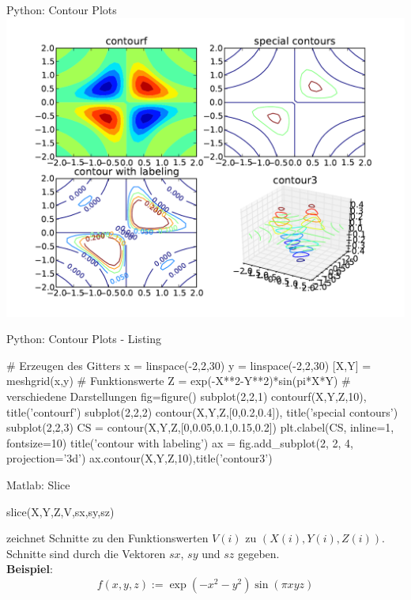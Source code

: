 \documentclass[hyperref={xetex}]{beamer}
\begin{document}
\begin{frame}[fragile]{Python: Contour Plots}
\hfil\includegraphics[width=1\textwidth]{figures/function_plot_contour_py}\hfil
\end{frame}
% 
% 
\begin{frame}[fragile]{Python: Contour Plots - Listing}
  \begin{pyin}
# Erzeugen des Gitters
x = linspace(-2,2,30)
y = linspace(-2,2,30)
[X,Y] = meshgrid(x,y)
# Funktionswerte
Z = exp(-X**2-Y**2)*sin(pi*X*Y)
# verschiedene Darstellungen
fig=figure()
subplot(2,2,1)
contourf(X,Y,Z,10), title('contourf')
subplot(2,2,2)
contour(X,Y,Z,[0,0.2,0.4]), title('special contours')
subplot(2,2,3)
CS = contour(X,Y,Z,[0,0.05,0.1,0.15,0.2])
plt.clabel(CS, inline=1, fontsize=10)
title('contour with labeling')
ax = fig.add_subplot(2, 2, 4, projection='3d')
ax.contour(X,Y,Z,10),title('contour3')    
  \end{pyin}
\end{frame}

%
% 
\begin{frame}[fragile]{Matlab: Slice}
\begin{matlabin}
slice(X,Y,Z,V,sx,sy,sz)
\end{matlabin}
zeichnet  Schnitte zu den Funktionswerten $V(i)$ zu
$(X(i),Y(i),Z(i))$. Schnitte sind durch die Vektoren $sx$, $sy$ und $sz$
gegeben.\\
\textbf{Beispiel}: \alert{ \[ f(x,y,z):=\exp(-x^2-y^2)\sin(\pi x y z) \]}
\end{frame}
\end{document}
